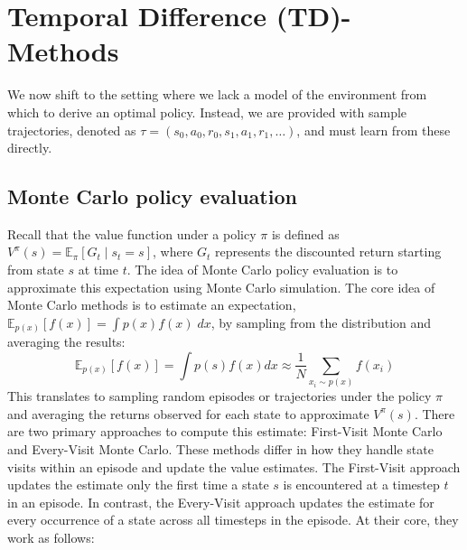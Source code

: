 \section{Temporal Difference (TD)- Methods}\label{section:td-methods}
We now shift to the setting where we lack a model of the environment from which to derive 
an optimal policy. Instead, we are provided with sample trajectories, denoted as 
$\tau = (s_0, a_0, r_0, s_1, a_1, r_1, \dots)$, and must learn from these directly.

\subsection{Monte Carlo policy evaluation}\label{Monte Carlo policy evaluation}
Recall that the value function under a policy $\pi$ is defined as 
$V^{\pi}(s) = \mathbb{E}_{\pi}\left[G_t \mid s_t = s\right]$, where $G_t$ represents 
the discounted return starting from state $s$ at time $t$. The idea of Monte Carlo policy evaluation
is to approximate this expectation using Monte Carlo simulation. The core idea of Monte 
Carlo methods is to estimate an expectation, $\mathbb{E}_{p(x)}\left[f(x)\right] = \int p(x) f(x) \; dx$, 
by sampling from the distribution and averaging the results:
$$\mathbb{E}_{p(x)}\left[f(x)\right] = \int p(s)f(x) dx \approx \frac{1}{N} 
\sum_{x_i \sim p(x)} f(x_i)$$
This translates to sampling random episodes or trajectories under the policy $\pi$ 
and averaging the returns observed for each state to approximate $V^{\pi}(s)$. 
There are two primary approaches to compute this estimate: First-Visit Monte Carlo and Every-Visit Monte Carlo.
These methods differ in how they handle state visits within an episode and update the value estimates. 
The First-Visit approach updates the estimate only the first time a state $s$ is encountered at a timestep $t$ 
in an episode. In contrast, the Every-Visit approach updates the estimate for every occurrence of a 
state across all timesteps in the episode. At their core, they work as follows:


